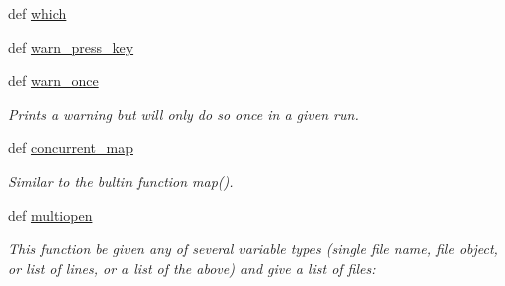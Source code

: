 \begin{DoxyCompactItemize}
def \hyperlink{namespaceforcebalance_1_1nifty_aa1ff334c4b4e30e91978b91d9a9ec065}{which}
\item 
def \hyperlink{namespaceforcebalance_1_1nifty_abb8f59044961a12588e0653c2baa8b01}{warn\-\_\-press\-\_\-key}
\item 
def \hyperlink{namespaceforcebalance_1_1nifty_a26e563ec71ed229c30f3d61d3448c8f1}{warn\-\_\-once}
\begin{DoxyCompactList}\small\item\em Prints a warning but will only do so once in a given run. \end{DoxyCompactList}\item 
def \hyperlink{namespaceforcebalance_1_1nifty_a2fc81730e7efa7d138dd86f733507bfc}{concurrent\-\_\-map}
\begin{DoxyCompactList}\small\item\em Similar to the bultin function map(). \end{DoxyCompactList}\item 
def \hyperlink{namespaceforcebalance_1_1nifty_a64b7c6ca7afa1c11681f5c2897c55cc3}{multiopen}
\begin{DoxyCompactList}\small\item\em This function be given any of several variable types (single file name, file object, or list of lines, or a list of the above) and give a list of files\-: \end{DoxyCompactList}\end{DoxyCompactItemize}
